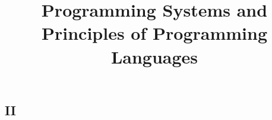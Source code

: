 
\begin{preamble}
\part{II}
\title{Programming Systems and Principles of Programming Languages}
\end{preamble}

\begin{questions}


\question

\newenvironment{bnf}{
    \begin{tabbing}
    XXXXXXX \= XXXX \= XXXXXXXXXXXXXXXXXXXXXXXXXXXXXXXXXX\kill}{
    \end{tabbing}
    }

\newcommand{\nt}[1]{{\it #1\/}}
\newcommand{\Or}[1]{\ \ $|$ \ \ #1}
\newcommand{\Rule}[2]{{\it #1} \> $\rightarrow$ \> #2}



\end{questions}
